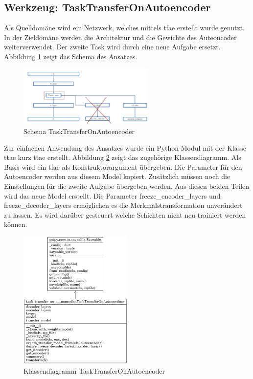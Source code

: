 	\subsection{Werkzeug: TaskTransferOnAutoencoder}
	\label{sec:TransferSecondCriterionAutoenocder}		
	Als Quelldomäne wird ein Netzwerk, welches mittels \ac{tfae} erstellt wurde genutzt. In der Zieldomäne werden die Architektur und die Gewichte des Auteoncoder weiterverwendet. Der zweite Task wird durch eine neue Aufgabe ersetzt. Abbildung \ref{img:SchemaTTAE} zeigt das Schema des Ansatzes. 
	\begin{figure}[h]
		\centering
		\includegraphics[width=0.6\textwidth, center]{bilder/Schema_Autoencoders/Schema_TSCAE.png}
		\caption[Schema TaskTransferOnAutoencoder]{Schema TaskTransferOnAutoencoder}
		\label{img:SchemaTTAE}
	\end{figure}
	Zur einfachen Anwendung des Ansatzes wurde ein Python-Modul mit der Klasse \acl{ttae} kurz \ac{ttae} erstellt. Abbildung \ref{img:KlassendiagrammTransferSecondCriterionAutoenocder} zeigt das zugehörige Klassendiagramm. Als Basis wird ein \ac{tfae} als Konstruktorargument übergeben. Die Parameter für den Autoencoder werden aus diesem Model kopiert. Zusätzlich müssen noch die Einstellungen für die zweite Aufgabe übergeben werden. Aus diesen beiden Teilen wird das neue Model erstellt. Die Parameter freeze\_encoder\_layers und freeze\_decoder\_layers ermöglichen es die Merkmalstransformation unverändert zu lassen. Es wird darüber gesteuert welche Schichten nicht neu trainiert werden können. 
	\begin{figure}[h]
		\centering
		\includegraphics[width=0.5\textwidth, center]{bilder/Klassendiagramme/TTAE.png}
		\caption[Klassendiagramm TaskTransferOnAutoencoder]{Klassendiagramm TaskTransferOnAutoencoder}
		\label{img:KlassendiagrammTransferSecondCriterionAutoenocder}
	\end{figure}  

